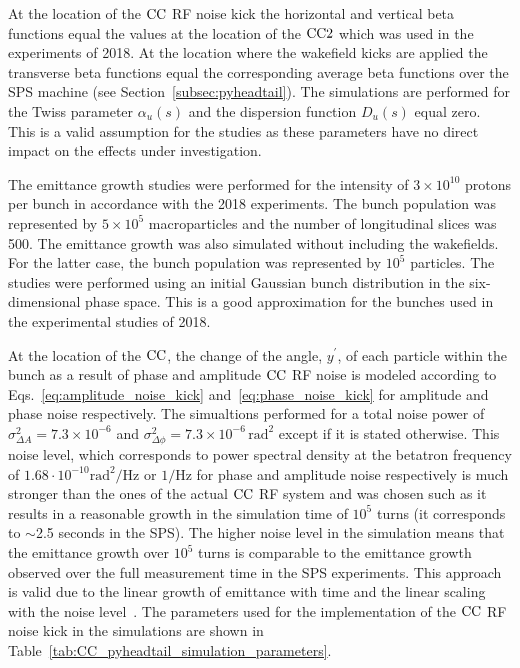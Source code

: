 At the location of the ${\mathrm{CC}}$ RF noise kick the horizontal and vertical beta functions equal the values at the location of the ${\mathrm{CC}}2$ which was used in the experiments of 2018. At the location where the wakefield kicks are applied the transverse beta functions equal the corresponding average beta functions over the SPS machine (see Section~\ref{subsec:pyheadtail}). The simulations are performed for the Twiss parameter $\alpha_u(s)$ and the dispersion function $D_u(s)$ equal zero. This is a valid assumption for the studies as these parameters have no direct impact on the effects under investigation.

The emittance growth studies were performed for the intensity of $3 \times 10^{10}$ protons per bunch in accordance with the 2018 experiments. The bunch population was represented by $5 \times 10^{5}$ macroparticles and the number of longitudinal slices was 500. The emittance growth was also simulated without including the wakefields. For the latter case, the bunch population was represented by $10^{5}$ particles. 
The studies were performed using an initial Gaussian bunch distribution in the six-dimensional phase space. This is a good approximation for the bunches used in the experimental studies of 2018. 

At the location of the ${\mathrm{CC}}$, the change of the angle, $y^\prime$, of each particle within the bunch as a result of phase and amplitude ${\mathrm{CC}}$ RF noise is modeled according to Eqs.~\eqref{eq:amplitude_noise_kick} and~\eqref{eq:phase_noise_kick} for amplitude and phase noise respectively. The simualtions performed for a total noise power of $\sigma_{\Delta A}^2 =7.3 \times 10^{-6}$  and $\sigma_{\Delta \phi}^2 =7.3 \times 10^{-6} \, \mathrm{rad^2}$ except if it is stated otherwise. This noise level, which corresponds to power spectral density at the betatron frequency of $1.68 \cdot 10^{-10} \mathrm{rad^2/Hz}$ or $\mathrm{1/Hz}$ for phase and amplitude noise respectively is much stronger than the ones of the actual ${\mathrm{CC}}$ RF system and was chosen such as it results in a reasonable growth in the simulation time of $10^5$ turns (it corresponds to $\sim$2.5 seconds in the SPS). The higher noise level in the simulation means that the emittance growth over $10^5$ turns is comparable to the emittance growth observed over the full measurement time in the SPS experiments.
This approach is valid due to the linear growth of emittance with time and the linear scaling with the noise level~\cite{PhysRevSTAB.18.101001}. The parameters used for the implementation of the ${\mathrm{CC}}$ RF noise kick in the simulations are shown in Table~\ref{tab:CC_pyheadtail_simulation_parameters}.

